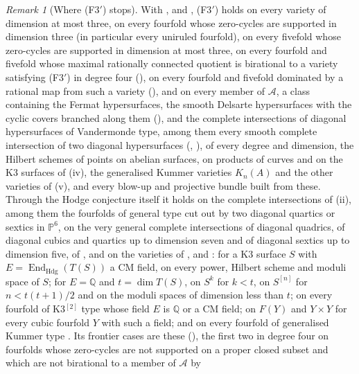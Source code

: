 \documentclass[11pt,reqno]{amsart}
\theoremstyle{plain}
\theoremstyle{definition}
\theoremstyle{remark}
\newtheorem{remark}[theorem]{Remark}
\newcommand{\QQ}{\mathbb{Q}}
\newcommand{\PP}{\mathbb{P}}
\DeclareMathOperator{\End}{End}
\begin{document}
\begin{remark}[Where \textup{(F3$'$)} stops]\label{rem:f3primefrontier}
With ,  and ,
\textup{(F3$'$)} holds on every variety of dimension at most three, on every
fourfold whose zero-cycles are supported in dimension three (in particular
every uniruled fourfold), on every fivefold whose zero-cycles are supported
in dimension at most three, on every fourfold and fivefold whose maximal
rationally connected quotient is birational to a variety satisfying
\textup{(F3$'$)} in degree four (), on every
fourfold and fivefold dominated by a rational map from such a variety
(), and on
every member of $\mathcal{A}$, a class containing the Fermat
hypersurfaces, the smooth Delsarte hypersurfaces with the cyclic covers
branched along them (), and the complete intersections
of diagonal hypersurfaces of Vandermonde type, among them every smooth
complete intersection of two diagonal hypersurfaces (,
), of every degree and dimension, the Hilbert schemes of points on
abelian surfaces, on products of curves and on the K3 surfaces of
(iv), the generalised Kummer varieties $K_{n}(A)$ and the
other varieties of (v), and every blow-up and projective bundle
built from these. Through the Hodge conjecture itself it holds on the
complete intersections of (ii), among them the
fourfolds of general type cut out by two diagonal quartics or sextics in
$\PP^{6}$, on the very general complete intersections of diagonal quadrics,
of diagonal cubics and quartics up to dimension seven and of diagonal
sextics up to dimension five, of , and on the
varieties of ,  and
: for a K3 surface $S$ with
$E=\End_{\mathrm{Hdg}}(T(S))$ a CM field, on every power, Hilbert scheme and
moduli space of $S$; for $E=\QQ$ and $t=\dim T(S)$, on $S^{k}$ for $k<t$, on
$S^{[n]}$ for $n<t(t+1)/2$ and on the moduli spaces of dimension less than
$t$; on every fourfold of K3$^{[2]}$ type whose field $E$ is $\QQ$ or a CM
field; on $F(Y)$ and $Y\times Y$ for every cubic fourfold $Y$ with such a
field; and on every fourfold of generalised Kummer type \cite{FV25}. Its
frontier cases are these (), the first two in
degree four on fourfolds whose zero-cycles are not supported on a proper
closed subset and which are not birational to a member of $\mathcal{A}$ by

\end{remark}
\end{document}

